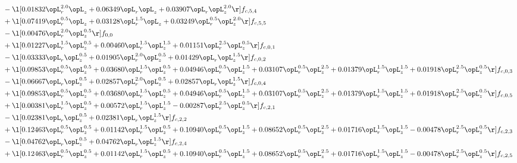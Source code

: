 \begin{alignat}{2}
& - \l[  0.01832 \opL_r^{2.0} \opL_z +  0.06349 \opL_r \opL_z +  0.03907 \opL_r \opL_z^{2.0}  \r] f_{c,5,4} \nonumber \\ 
& + \l[  0.07419 \opL_r^{0.5} \opL_z +  0.03128 \opL_r^{1.5} \opL_z +  0.03249 \opL_r^{0.5} \opL_z^{2.0}  \r] f_{c,5,5} \nonumber \\ 
& - \l[  0.00476 \opL_r^{2.0} \opL_z^{0.5}  \r] f_{0,0} \nonumber \\ 
& + \l[  0.01227 \opL_r^{1.5} \opL_z^{0.5} +  0.00460 \opL_r^{1.5} \opL_z^{1.5} +  0.01151 \opL_r^{2.5} \opL_z^{0.5}  \r] f_{c,0,1} \nonumber \\ 
& - \l[  0.03333 \opL_r \opL_z^{0.5} +  0.01905 \opL_r^{2.0} \opL_z^{0.5} +  0.01429 \opL_r \opL_z^{1.5}  \r] f_{c,0,2} \nonumber \\ 
& + \l[  0.09853 \opL_r^{0.5} \opL_z^{0.5} +  0.03680 \opL_r^{1.5} \opL_z^{0.5} +  0.04946 \opL_r^{0.5} \opL_z^{1.5} +  0.03107 \opL_r^{0.5} \opL_z^{2.5} +  0.01379 \opL_r^{1.5} \opL_z^{1.5} +  0.01918 \opL_r^{2.5} \opL_z^{0.5}  \r] f_{c,0,3} \nonumber \\ 
& - \l[  0.06667 \opL_r \opL_z^{0.5} +  0.02857 \opL_r^{2.0} \opL_z^{0.5} +  0.02857 \opL_r \opL_z^{1.5}  \r] f_{c,0,4} \nonumber \\ 
& + \l[  0.09853 \opL_r^{0.5} \opL_z^{0.5} +  0.03680 \opL_r^{1.5} \opL_z^{0.5} +  0.04946 \opL_r^{0.5} \opL_z^{1.5} +  0.03107 \opL_r^{0.5} \opL_z^{2.5} +  0.01379 \opL_r^{1.5} \opL_z^{1.5} +  0.01918 \opL_r^{2.5} \opL_z^{0.5}  \r] f_{c,0,5} \nonumber \\ 
& + \l[  0.00381 \opL_r^{1.5} \opL_z^{0.5} +  0.00572 \opL_r^{1.5} \opL_z^{1.5}   -0.00287 \opL_r^{2.5} \opL_z^{0.5}  \r] f_{c,2,1} \nonumber \\ 
& - \l[  0.02381 \opL_r \opL_z^{0.5} +  0.02381 \opL_r \opL_z^{1.5}  \r] f_{c,2,2} \nonumber \\ 
& + \l[  0.12463 \opL_r^{0.5} \opL_z^{0.5} +  0.01142 \opL_r^{1.5} \opL_z^{0.5} +  0.10940 \opL_r^{0.5} \opL_z^{1.5} +  0.08652 \opL_r^{0.5} \opL_z^{2.5} +  0.01716 \opL_r^{1.5} \opL_z^{1.5}   -0.00478 \opL_r^{2.5} \opL_z^{0.5}  \r] f_{c,2,3} \nonumber \\ 
& - \l[  0.04762 \opL_r \opL_z^{0.5} +  0.04762 \opL_r \opL_z^{1.5}  \r] f_{c,2,4} \nonumber \\ 
& + \l[  0.12463 \opL_r^{0.5} \opL_z^{0.5} +  0.01142 \opL_r^{1.5} \opL_z^{0.5} +  0.10940 \opL_r^{0.5} \opL_z^{1.5} +  0.08652 \opL_r^{0.5} \opL_z^{2.5} +  0.01716 \opL_r^{1.5} \opL_z^{1.5}   -0.00478 \opL_r^{2.5} \opL_z^{0.5}  \r] f_{c,2,5} \nonumber \\ 

\end{alignat}
